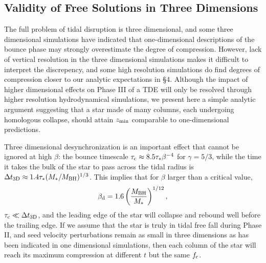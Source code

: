 \documentclass[useAMS, twocolumn, usenatbib]{mn2e}
\begin{document}
\subsection{Validity of Free Solutions in Three Dimensions}
The full problem of tidal disruption is three dimensional, and some three dimensional simulations \citep{Laguna+93, Guillochon+09} have indicated that one-dimensional descriptions of the bounce phase \citep{LuminetCarter86} may strongly overestimate the degree of compression.  However, lack of vertical resolution in the three dimensional simulations makes it difficult to interpret the discrepency, and some high resolution simulations \citep{RosswogRR09} do find degrees of compression closer to our analytic expectations in \S 4.  Although the impact of higher dimensional effects on Phase III of a TDE will only be resolved through higher resolution hydrodynamical simulations, we present here a simple analytic argument suggesting that a star made of many columns, each undergoing homologous collapse, should attain $z_{\rm min}$ comparable to one-dimensional predictions.

Three dimensional desynchronization is an important effect that cannot be ignored at high $\beta$: the bounce timescale $\tau_{\rm c}\approx 8.5\tau_*\beta^{-4}$ for $\gamma=5/3$, while the time it takes the bulk of the star to pass across the tidal radius is $\Delta t_{\rm 3D} \approx 1.4 \tau_* (M_*/M_{\rm BH})^{1/3}$.  This implies that for $\beta$ larger than a critical value,
\begin{equation}
\beta_{\rm d}=1.6\left(\frac{M_{\rm BH}}{M_*}\right)^{1/12},
\end{equation}
$\tau_{\rm c} \ll \Delta t_{\rm 3D}$, and the leading edge of the star will collapse and rebound well before the trailing edge.  If we assume that the star is truly in tidal free fall during Phase II, and seed velocity perturbations remain as small in three dimensions as has been indicated in one dimensional simulations, then each column of the star will reach its maximum compression at different $t$ but the same $f_{\rm c}$. 
\end{document}
